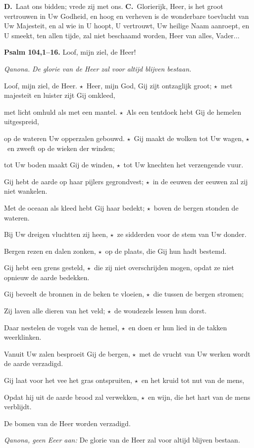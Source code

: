 \documentclass[12pt,twoside,a5paper]{article}
\newlength{\origparskip}
\newenvironment{halfparskip}{
  \setlength{\parskip}{0.5\origparskip}
}{
  \setlength{\parskip}{\origparskip}
}
\newcommand{\cc}{{\color{BrickRed} \textbf{C.}}}
\newcommand{\dd}{{\color{BrickRed} \textbf{D.}}}
\newcommand{\sep}{{\color{BrickRed} \textbf{$\star$}}}
\newcommand{\liturgicalhint}[1]{{\color{BrickRed}\footnotesize\itshape{#1}}}
\newcommand{\liturgicaloption}[1]{{\color{BrickRed}\textbf{#1}}}
\newcommand{\qanona}[1]{{\liturgicalhint{Qanona.}} \emph{#1}}
\newcommand{\psalm}[1]{\liturgicaloption{Psalm #1.}}
\begin{document}
\dd\ Laat ons bidden; vrede zij met ons. \cc\ Glorierijk, Heer, is het groot vertrouwen in Uw Godheid, en hoog en verheven is de wonderbare toevlucht van Uw Majesteit, en al wie in U hoopt, U vertrouwt, Uw heilige Naam aanroept, en U smeekt, ten allen tijde, zal niet beschaamd worden, Heer van alles, Vader...

\begin{halfparskip}
  \psalm{104,1--16} Loof, mijn ziel, de Heer!

  \qanona{De glorie van de Heer zal voor altijd blijven bestaan.}

  Loof, mijn ziel, de Heer. \sep\ Heer, mijn God, Gij zijt ontzaglijk groot; \sep\ met majesteit en luister zijt Gij omkleed,

  met licht omhuld als met een mantel. \sep\ Als een tentdoek hebt Gij de hemelen uitgespreid,

  op de wateren Uw opperzalen gebouwd. \sep\ Gij maakt de wolken tot Uw wagen, \sep\ en zweeft op de wieken der winden;

  tot Uw boden maakt Gij de winden, \sep\ tot Uw knechten het verzengende vuur.

  Gij hebt de aarde op haar pijlers gegrondvest; \sep\ in de eeuwen der eeuwen zal zij niet wankelen.

  Met de oceaan als kleed hebt Gij haar bedekt; \sep\ boven de bergen stonden de wateren.

  Bij Uw dreigen vluchtten zij heen, \sep\ ze sidderden voor de stem van Uw donder.

  Bergen rezen en dalen zonken, \sep\ op de plaats, die Gij hun hadt bestemd.

  Gij hebt een grens gesteld, \sep\ die zij niet overschrijden mogen, opdat ze niet opnieuw de aarde bedekken.

  Gij beveelt de bronnen in de beken te vloeien, \sep\ die tussen de bergen stromen;

  Zij laven alle dieren van het veld; \sep\ de woudezels lessen hun dorst.

  Daar nestelen de vogels van de hemel, \sep\ en doen er hun lied in de takken weerklinken.

  Vanuit Uw zalen besproeit Gij de bergen, \sep\ met de vrucht van Uw werken wordt de aarde verzadigd.

  Gij laat voor het vee het gras ontspruiten, \sep\ en het kruid tot nut van de mens,

  Opdat hij uit de aarde brood zal verwekken, \sep\ en wijn, die het hart van de mens verblijdt.

  De bomen van de Heer worden verzadigd.

  \liturgicalhint{Qanona, geen Eeer aan:} De glorie van de Heer zal voor altijd blijven bestaan.
\end{halfparskip}
\end{document}
